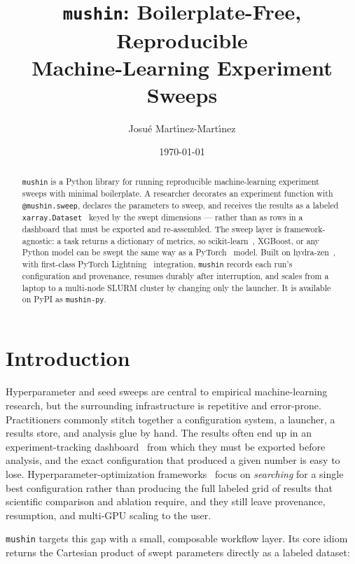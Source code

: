 \documentclass[11pt]{article}
\title{\texttt{mushin}: Boilerplate-Free, Reproducible\\
       Machine-Learning Experiment Sweeps}
\author{Josu\'e Mart\'{\i}nez-Mart\'{\i}nez}
\date{\today}
\begin{document}
\maketitle

\begin{abstract}
\texttt{mushin} is a Python library for running reproducible machine-learning
experiment sweeps with minimal boilerplate. A researcher decorates an experiment
function with \texttt{@mushin.sweep}, declares the parameters to sweep, and
receives the results as a labeled \texttt{xarray.Dataset}~\citep{hoyer2017xarray}
keyed by the swept dimensions --- rather than as rows in a dashboard that must be
exported and re-assembled. The sweep layer is framework-agnostic: a task returns
a dictionary of metrics, so scikit-learn~\citep{pedregosa2011scikit}, XGBoost, or
any Python model can be swept the same way as a PyTorch~\citep{paszke2019pytorch}
model. Built on hydra-zen~\citep{hydrazen2022}, with first-class PyTorch
Lightning~\citep{falcon2019lightning} integration, \texttt{mushin} records each run's configuration
and provenance, resumes durably after interruption, and scales from a laptop to a
multi-node SLURM cluster by changing only the launcher. It is available on PyPI
as \texttt{mushin-py}.
\end{abstract}

\section{Introduction}

Hyperparameter and seed sweeps are central to empirical machine-learning
research, but the surrounding infrastructure is repetitive and error-prone.
Practitioners commonly stitch together a configuration system, a launcher, a
results store, and analysis glue by hand. The results often end up in an
experiment-tracking dashboard~\citep{biewald2020wandb, mlflow2018} from which they
must be exported before analysis, and the exact configuration that produced a
given number is easy to lose.
Hyperparameter-optimization frameworks~\citep{akiba2019optuna, liaw2018tune} focus
on \emph{searching} for a single best configuration rather than producing the
full labeled grid of results that scientific comparison and ablation require, and
they still leave provenance, resumption, and multi-GPU scaling to the user.

\texttt{mushin} targets this gap with a small, composable workflow layer. Its core
idiom returns the Cartesian product of swept parameters directly as a labeled
dataset:
\end{document}
